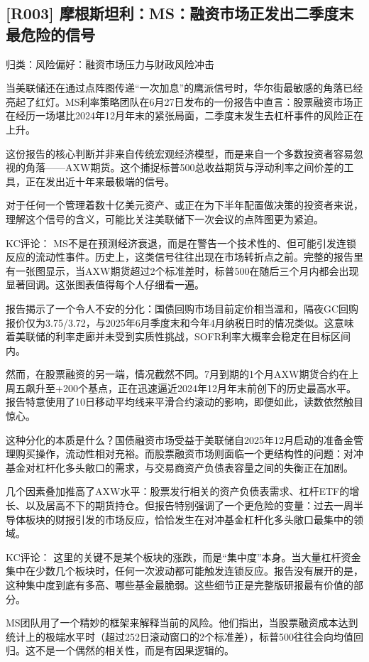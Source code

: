 \documentclass[11pt]{ctexart}
\begin{document}
\subsection{[R003] 摩根斯坦利：MS：融资市场正发出二季度末最危险的信号}
{\small\color{refgray}归类：风险偏好：融资市场压力与财政风险冲击}

当美联储还在通过点阵图传递“一次加息”的鹰派信号时，华尔街最敏感的角落已经亮起了红灯。MS利率策略团队在6月27日发布的一份报告中直言：股票融资市场正在经历一场堪比2024年12月年末的紧张局面，二季度末发生去杠杆事件的风险正在上升。

这份报告的核心判断并非来自传统宏观经济模型，而是来自一个多数投资者容易忽视的角落——AXW期货。这个捕捉标普500总收益期货与浮动利率之间价差的工具，正在发出近十年来最极端的信号。

对于任何一个管理着数十亿美元资产、或正在为下半年配置做决策的投资者来说，理解这个信号的含义，可能比关注美联储下一次会议的点阵图更为紧迫。

KC评论： MS不是在预测经济衰退，而是在警告一个技术性的、但可能引发连锁反应的流动性事件。历史上，这类信号往往出现在市场转折点之前。完整的报告里有一张图显示，当AXW期货超过2个标准差时，标普500在随后三个月内都会出现显著回调。这张图表值得每个人仔细看一遍。

报告揭示了一个令人不安的分化：国债回购市场目前定价相当温和，隔夜GC回购报价仅为3.75/3.72，与2025年6月季度末和今年4月纳税日时的情况类似。这意味着美联储的利率走廊并未受到实质性挑战，SOFR利率大概率会稳定在目标区间内。

然而，在股票融资的另一端，情况截然不同。7月到期的1个月AXW期货合约在上周五飙升至+200个基点，正在迅速逼近2024年12月年末前创下的历史最高水平。报告特意使用了10日移动平均线来平滑合约滚动的影响，即便如此，读数依然触目惊心。

这种分化的本质是什么？国债融资市场受益于美联储自2025年12月启动的准备金管理购买操作，流动性相对充裕。而股票融资市场则面临一个更结构性的问题：对冲基金对杠杆化多头敞口的需求，与交易商资产负债表容量之间的失衡正在加剧。

几个因素叠加推高了AXW水平：股票发行相关的资产负债表需求、杠杆ETF的增长、以及居高不下的期货持仓。但报告特别强调了一个更危险的变量：过去一周半导体板块的财报引发的市场反应，恰恰发生在对冲基金杠杆化多头敞口最集中的领域。

KC评论： 这里的关键不是某个板块的涨跌，而是“集中度”本身。当大量杠杆资金集中在少数几个板块时，任何一次波动都可能触发连锁反应。报告没有展开的是，这种集中度到底有多高、哪些基金最脆弱。这些细节正是完整版研报最有价值的部分。

MS团队用了一个精妙的框架来解释当前的风险。他们指出，当股票融资成本达到统计上的极端水平时（超过252日滚动窗口的2个标准差），标普500往往会向均值回归。这不是一个偶然的相关性，而是有因果逻辑的。
\end{document}
